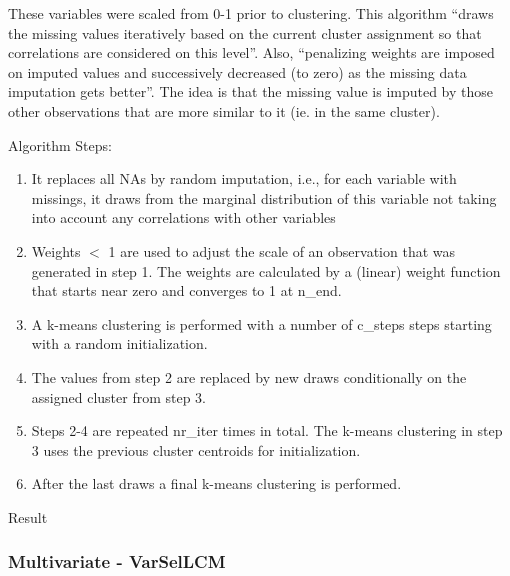 \documentclass[11pt, a4paper]{article}
\begin{document}
These variables were scaled from 0-1 prior to clustering.
This algorithm ``draws the missing values iteratively based on the current cluster assignment so that correlations are considered on this level''. Also, ``penalizing weights are imposed on imputed values and successively decreased (to zero) as the missing data imputation gets better''. The idea is that the missing value is imputed by those other observations that are more similar to it (ie. in the same cluster).
\par
Algorithm Steps:
\begin{enumerate}
\item It replaces all NAs by random imputation, i.e., for each variable with missings, it draws from the marginal distribution of this variable not taking into account any correlations with other variables 
\item Weights $<$ 1 are used to adjust the scale of an observation that was generated in step 1. The weights are calculated by a (linear) weight function that starts near zero and converges to 1 at n\_end. 
\item A k-means clustering is performed with a number of c\_steps steps starting with a random initialization. 
\item The values from step 2 are replaced by new draws conditionally on the assigned cluster from step 3. 
\item Steps 2-4 are repeated nr\_iter times in total. The k-means clustering in step 3 uses the previous cluster centroids for initialization. 
\item After the last draws a final k-means clustering is performed.
\end{enumerate}

Result 






\subsubsection{Multivariate - VarSelLCM}
\end{document}
